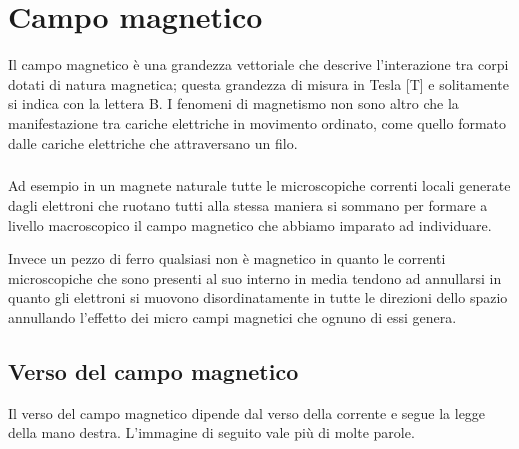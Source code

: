 \chapter{Campo magnetico}

Il campo magnetico è una grandezza vettoriale che descrive l'interazione tra corpi dotati di natura magnetica; questa grandezza di misura in Tesla [T] e solitamente si indica con la lettera B.
I fenomeni di magnetismo non sono altro che la manifestazione tra cariche elettriche in movimento ordinato, come quello formato dalle cariche elettriche che attraversano un filo.
\paragraph{}
Ad esempio in un magnete naturale tutte le microscopiche correnti locali
generate dagli elettroni che ruotano tutti alla stessa maniera si sommano per
formare a livello macroscopico il campo magnetico che abbiamo imparato ad
individuare.

Invece un pezzo di ferro qualsiasi non è magnetico in quanto le correnti
microscopiche che sono presenti al suo interno in media tendono ad annullarsi in
quanto gli elettroni si muovono disordinatamente in tutte le direzioni dello spazio
annullando l'effetto dei micro campi magnetici che ognuno di essi genera.

\section{Verso del campo magnetico}
Il verso del campo magnetico dipende dal verso della corrente e segue la legge della mano destra. L'immagine di seguito vale più di molte parole.

